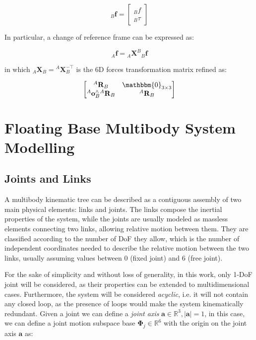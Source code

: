 \begin{equation}
    {}_{B}\mathbf{f} = \begin{bmatrix}
        {}_{B}f \\
        {}_{B}\tau
    \end{bmatrix}
\end{equation}

In particular, a change of reference frame can be expressed as:

\begin{equation}
    {}_{A}\mathbf{f} = {}_{A}\mathbf{X}^B {}_{B}\mathbf{f}
\end{equation}

in which ${}_{A}\mathbf{X}_B = {}^A\mathbf{X}_B ^{-\top}$ is the $6$D forces transformation matrix refined as:

\begin{equation}
    \begin{bmatrix}
        {}^A\mathbf{R}_B                         & \mathbbm{0}_{3 \times 3} \\
        {}^A\mathbf{o}_B^\wedge {}^A\mathbf{R}_B & {}^A\mathbf{R}_B
    \end{bmatrix}
\end{equation}

\section{Floating Base Multibody System Modelling}

\subsection{Joints and Links}

A multibody kinematic tree can be described as a contiguous assembly of two main physical elements: links and joints. The links compose the inertial properties of the system, while the joints are usually modeled as massless elements connecting two links, allowing relative motion between them. They are classified according to the number of \ac{DoF} they allow, which is the number of independent coordinates needed to describe the relative motion between the two links, usually assuming values between 0 (fixed joint) and 6 (free joint).

For the sake of simplicity and without loss of generality, in this work, only 1-\ac{DoF} joint will be considered, as their properties can be extended to multidimensional cases. Furthermore, the system will be considered \textit{acyclic}, i.e. it will not contain any closed loop, as the presence of loops would make the system kinematically redundant.
Given a joint we can define a \textit{joint axis} $\mathbf{a} \in \mathbb{R}^3, |\mathbf{a}| = 1$, in this case, we can define a joint motion subspace base $\boldsymbol{\Phi} _j \in \mathbb{R} ^6$ with the origin on the joint axis $\mathbf{a}$ as:

